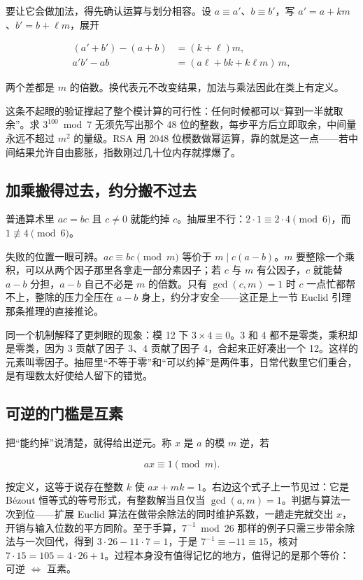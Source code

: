 要让它会做加法，得先确认运算与划分相容。设 \(a\equiv a'\)、\(b\equiv b'\)，写 \(a'=a+km\)、\(b'=b+\ell m\)，展开

\[
\begin{aligned}
(a'+b')-(a+b) &= (k+\ell)m,\\
a'b'-ab &= (a\ell+bk+k\ell m)\,m,
\end{aligned}
\]

两个差都是 \(m\) 的倍数。换代表元不改变结果，加法与乘法因此在类上有定义。

这条不起眼的验证撑起了整个模计算的可行性：任何时候都可以``算到一半就取余''。求 \(3^{100}\bmod 7\) 无须先写出那个 48 位的整数，每步平方后立即取余，中间量永远不超过 \(m^2\) 的量级。RSA 用 2048 位模数做幂运算，靠的就是这一点——若中间结果允许自由膨胀，指数刚过几十位内存就撑爆了。

\subsection{加乘搬得过去，约分搬不过去}

普通算术里 \(ac=bc\) 且 \(c\neq0\) 就能约掉 \(c\)。抽屉里不行：\(2\cdot1\equiv2\cdot4\pmod6\)，而 \(1\not\equiv4\pmod 6\)。

失败的位置一眼可辨。\(ac\equiv bc\pmod m\) 等价于 \(m\mid c(a-b)\)。\(m\) 要整除一个乘积，可以从两个因子那里各拿走一部分素因子；若 \(c\) 与 \(m\) 有公因子，\(c\) 就能替 \(a-b\) 分担，\(a-b\) 自己不必是 \(m\) 的倍数。只有 \(\gcd(c,m)=1\) 时 \(c\) 一点忙都帮不上，整除的压力全压在 \(a-b\) 身上，约分才安全——这正是上一节 Euclid 引理那条推理的直接推论。

同一个机制解释了更刺眼的现象：模 12 下 \(3\times4\equiv0\)。3 和 4 都不是零类，乘积却是零类，因为 3 贡献了因子 3、4 贡献了因子 4，合起来正好凑出一个 12。这样的元素叫零因子。抽屉里``不等于零''和``可以约掉''是两件事，日常代数里它们重合，是有理数太好使给人留下的错觉。

\subsection{可逆的门槛是互素}

把``能约掉''说清楚，就得给出逆元。称 \(x\) 是 \(a\) 的模 \(m\) 逆，若

\[
ax\equiv1\pmod m.
\]

按定义，这等于说存在整数 \(k\) 使 \(ax+mk=1\)。右边这个式子上一节见过：它是 Bézout 恒等式的等号形式，有整数解当且仅当 \(\gcd(a,m)=1\)。判据与算法一次到位——扩展 Euclid 算法在做带余除法的同时维护系数，一趟走完就交出 \(x\)，开销与输入位数的平方同阶。至于手算，\(7^{-1}\bmod 26\) 那样的例子只需三步带余除法与一次回代，得到 \(3\cdot26-11\cdot7=1\)，于是 \(7^{-1}\equiv-11\equiv15\)，核对 \(7\cdot15=105=4\cdot26+1\)。过程本身没有值得记忆的地方，值得记的是那个等价：可逆 \(\Longleftrightarrow\) 互素。

